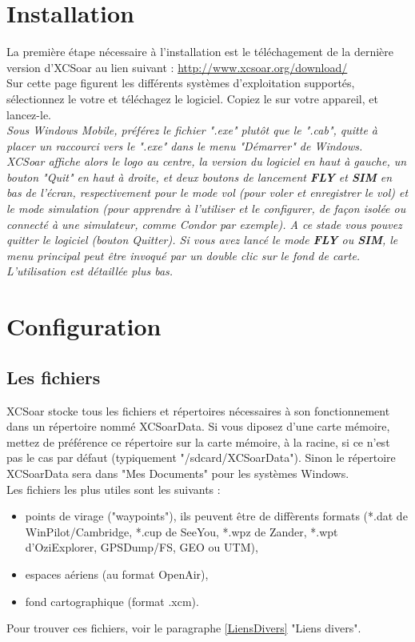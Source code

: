 \documentclass{article}
\begin{document}
\section{Installation}
\noindent
La première étape nécessaire à l'installation est le téléchagement de la dernière version d'XCSoar au lien suivant : \url{http://www.xcsoar.org/download/}\\
Sur cette page figurent les différents systèmes d'exploitation supportés, sélectionnez le votre et téléchagez le logiciel. Copiez le sur votre appareil, et lancez-le.\\
\newline
\itshape Sous Windows Mobile, préférez le fichier ".exe" plutôt que le ".cab", quitte à placer un raccourci vers le ".exe" dans le menu "Démarrer" de Windows.\upshape\\
\newline
XCSoar affiche alors le logo au centre, la version du logiciel en haut à gauche, un bouton "Quit" en haut à droite, et deux boutons de lancement \textbf{FLY} et \textbf{SIM} en bas de l'écran, respectivement pour le mode vol (pour voler et enregistrer le vol) et le mode simulation (pour apprendre à l'utiliser et le configurer, de façon isolée ou connecté à une simulateur, comme Condor par exemple). A ce stade vous pouvez quitter le logiciel (bouton Quitter).
%
Si vous avez lancé le mode \textbf{FLY} ou \textbf{SIM}, le menu principal peut être invoqué par un double clic sur le fond de carte.
L'utilisation est détaillée plus bas.
%
\section{Configuration}
%
\subsection{Les fichiers}
\noindent
XCSoar stocke tous les fichiers et répertoires nécessaires à son fonctionnement dans un répertoire nommé XCSoarData. Si vous diposez d'une carte mémoire, mettez de préférence ce répertoire sur la carte mémoire, à la racine, si ce n'est pas le cas par défaut (typiquement "/sdcard/XCSoarData"). Sinon le répertoire XCSoarData sera dans "Mes Documents" pour les systèmes Windows.\\
Les fichiers les plus utiles sont les suivants :
\begin{itemize}
\item points de virage ("waypoints"), ils peuvent être de diffèrents formats (*.dat de WinPilot/Cambridge, *.cup de SeeYou, *.wpz de Zander, *.wpt d'OziExplorer, GPSDump/FS, GEO ou UTM),
\item espaces aériens (au format OpenAir),
\item fond cartographique (format .xcm).
\end{itemize}
Pour trouver ces fichiers, voir le paragraphe \ref{LiensDivers} "Liens divers".
%
\end{document}
